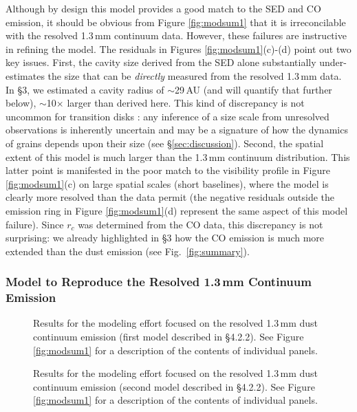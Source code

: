 {Although by design this model provides a good match to the SED and CO emission,
it should be obvious from Figure \ref{fig:modsum1} that it is
irreconcilable with the resolved 1.3\,mm continuum data.  However, these 
failures are instructive in refining the model.  The residuals in Figures 
\ref{fig:modsum1}(c)-(d) point out two key issues.  First, the cavity size 
derived from the SED alone substantially under-estimates the size that can be 
{\it directly} measured from the resolved 1.3\,mm data.  In \S 3, we estimated 
a cavity radius of $\sim$29\,AU (and will quantify that further below), 
$\sim$10$\times$ larger than derived here.  This kind of discrepancy is not 
uncommon for transition disks \citep[e.g., DM Tau;][]{andrews11}: any inference 
of a size scale from unresolved observations is inherently uncertain and may 
be a signature of how the dynamics of grains depends upon their size (see 
\S\ref{sec:discussion}).  Second, 
the spatial extent of this model is much larger than the 1.3\,mm continuum 
distribution.  This latter point is manifested in the poor match to the 
visibility profile in Figure \ref{fig:modsum1}(c) on large spatial scales 
(short baselines), where the model is clearly more resolved than the data 
permit (the negative residuals outside the emission ring in Figure 
\ref{fig:modsum1}(d) represent the same aspect of this model failure).  Since 
$r_c$ was determined from the CO data, this discrepancy is not surprising: we 
already highlighted in \S 3 how the CO emission is much more extended than the 
dust emission (see Fig.~\ref{fig:summary}).


\subsubsection{Model to Reproduce the Resolved 1.3\,mm Continuum Emission}
\label{sec:model2}

\begin{figure}[t!]
\caption{Results for the modeling effort focused on the resolved 1.3\,mm 
dust continuum emission (first model described in \S 4.2.2).  See Figure 
\ref{fig:modsum1} for a description of the contents of individual panels.  
\label{fig:modsum2a}}
\end{figure}

\begin{figure}[t!]
\caption{Results for the modeling effort focused on the resolved 1.3\,mm 
dust continuum emission (second model described in \S 4.2.2).  See Figure 
\ref{fig:modsum1} for a description of the contents of individual panels.  
\label{fig:modsum2}}
\end{figure}

}
